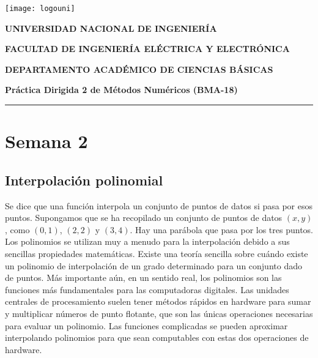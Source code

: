 


\noindent\parbox[c]{.18\textwidth}{\texttt{[image: logouni]}}\hfill
\parbox[c]{1\textwidth}{\raggedright%
    {\large\textbf{UNIVERSIDAD NACIONAL DE INGENIERÍA} \par\smallskip}
    {\large\textbf{FACULTAD DE INGENIERÍA ELÉCTRICA Y ELECTRÓNICA} \par\smallskip}
    {\large\textbf{DEPARTAMENTO ACADÉMICO DE CIENCIAS BÁSICAS} \par\smallskip}
}

\begin{center}\bfseries\large
    Práctica Dirigida 2 de Métodos Numéricos (BMA-18)
\end{center}

\vspace{-0.5cm}

\hrulefill
\vspace{-2.5mm}

\rule{16.5cm}{0.8mm}

\section{Semana 2}
\subsection{Interpolación polinomial}

Se dice que una función interpola un conjunto de puntos de datos
si pasa por esos puntos.
Supongamos que se ha recopilado un conjunto de puntos de datos
$\left(x,y\right)$, como $\left(0,1\right)$, $\left(2,2\right)$ y
$\left(3,4\right)$.
Hay una parábola que pasa por los tres puntos.
Los polinomios se utilizan muy a menudo para la interpolación
debido a sus sencillas propiedades matemáticas.
Existe una teoría sencilla sobre cuándo existe un polinomio de
interpolación de un grado determinado para un conjunto dado de
puntos.
Más importante aún, en un sentido real, los polinomios son las
funciones más fundamentales para las computadoras digitales.
Las unidades centrales de procesamiento suelen tener métodos
rápidos en hardware para sumar y multiplicar números de punto
flotante, que son las únicas operaciones necesarias para evaluar
un polinomio.
Las funciones complicadas se pueden aproximar interpolando
polinomios para que sean computables con estas dos operaciones de
hardware.

